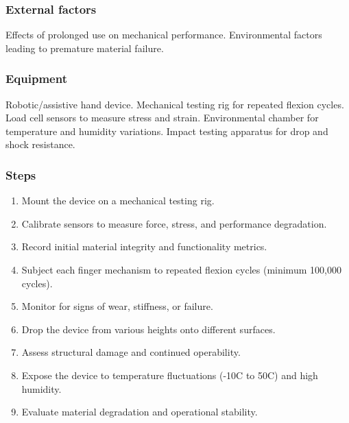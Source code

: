 \documentclass{article}
\begin{document}
\subsubsection{External factors}
Effects of prolonged use on mechanical performance. Environmental factors leading to premature material failure.
\subsubsection{Equipment}
Robotic/assistive hand device. Mechanical testing rig for repeated flexion cycles. Load cell sensors to measure stress and strain. Environmental chamber for temperature and humidity variations. Impact testing apparatus for drop and shock resistance.
\subsubsection{Steps}
\begin{enumerate}
    \item Mount the device on a mechanical testing rig.
    \item Calibrate sensors to measure force, stress, and performance degradation.
    \item Record initial material integrity and functionality metrics.
    \item Subject each finger mechanism to repeated flexion cycles (minimum 100,000 cycles).
    \item Monitor for signs of wear, stiffness, or failure.
    \item Drop the device from various heights onto different surfaces. 
    \item Assess structural damage and continued operability.
    \item Expose the device to temperature fluctuations (-10C to 50C) and high humidity.
    \item Evaluate material degradation and operational stability.
\end{enumerate}
\end{document}
